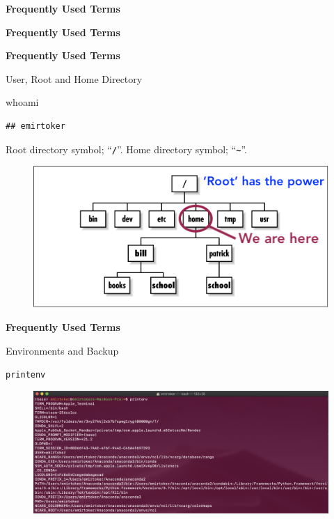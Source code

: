 \documentclass[ignorenonframetext,]{beamer}
\newenvironment{Shaded}{\begin{snugshade}}{\end{snugshade}}
\newcommand{\FunctionTok}[1]{\textcolor[rgb]{0.00,0.00,0.00}{#1}}
\begin{document}
\begin{frame}[fragile]{\textbf{Frequently Used Terms}}
\begin{block}{\textbf{Frequently Used Terms}}
\end{block}

\begin{block}{\textbf{Frequently Used Terms}}

User, Root and Home Directory

\begin{Shaded}
\begin{Highlighting}[]
\FunctionTok{whoami}
\end{Highlighting}
\end{Shaded}

\begin{verbatim}
## emirtoker
\end{verbatim}

Root directory symbol; ``\textbf{\texttt{/}}''. Home directory symbol;
``\textbf{\texttt{\textasciitilde{}}}''.

\begin{figure}
\centering
\includegraphics{root_fig.gif}
\caption{}
\end{figure}

\end{block}

\begin{block}{\textbf{Frequently Used Terms}}

Environments and Backup

\begin{verbatim}
printenv  
\end{verbatim}

\begin{figure}
\centering
\includegraphics{printenv.png}
\caption{}
\end{figure}


\end{block}
\end{frame}
\end{document}
